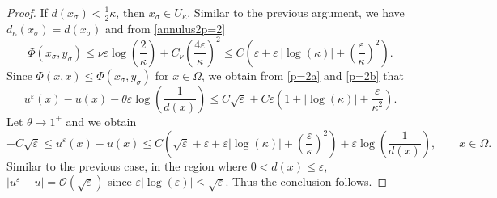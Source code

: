 \documentclass[12pt,reqno]{amsart}
\numberwithin{figure}{section}
\theoremstyle{plain}
\theoremstyle{remark}
\newtheorem{rem}{\bf{Remark}}
\numberwithin{equation}{section}
\begin{document}
\begin{proof}
\noindent
If $d(x_\sigma)<\frac{1}{2}\kappa$, then $x_\sigma\in U_\kappa$. Similar to the previous argument, we have $d_\kappa(x_\sigma) = d(x_\sigma)$ and from \eqref{annulus2p=2}
\begin{equation}\label{p=2b}
    \Phi(x_\sigma,y_\sigma) \leq \nu\varepsilon \log\left(\frac{2}{\kappa}\right) + C_\nu\left(\frac{4\varepsilon}{\kappa}\right)^2 \leq C\left(\varepsilon+\varepsilon\,|\log(\kappa)| + \left(\frac{\varepsilon}{\kappa}\right)^2\right).
\end{equation}
Since $\Phi(x,x)\leq \Phi(x_\sigma,y_\sigma)$ for $x\in \Omega$, we obtain from \eqref{p=2a} and \eqref{p=2b} that
\begin{equation*}
    u^\varepsilon(x) - u(x) - \theta\varepsilon\log\left(\frac{1}{d(x)}\right) \leq C\sqrt{\varepsilon} +C\varepsilon \left(1+|\log(\kappa)| + \frac{\varepsilon}{\kappa^2}\right).
\end{equation*}
Let $\theta\to 1^+$ and we obtain 
\begin{equation*}
    -C\sqrt{\varepsilon}\leq u^\varepsilon(x) - u(x) \leq C \left(\sqrt{\varepsilon}+\varepsilon+\varepsilon|\log(\kappa)| + \left(\frac{\varepsilon}{\kappa}\right)^2\right) +  \varepsilon \log\left(\frac{1}{d(x)}\right), \qquad x\in \Omega.
\end{equation*}
Similar to the previous case, in the region where $0< d(x)\leq \varepsilon$, $|u^\varepsilon-u|=\mathcal{O}(\sqrt{\varepsilon})$ since $\varepsilon|\log(\varepsilon)|\leq \sqrt{\varepsilon}$. Thus the conclusion follows.
\end{proof}


\end{document}

